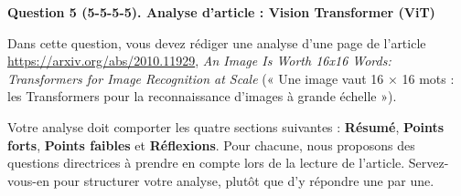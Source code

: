 \documentclass[12pt]{article}
\newif\ifsolution
\theoremstyle{definition}
\newcommand{\Answer}[1]{%
  \ifsolution
    {\color{answer}#1}%
  \fi
}
\newcommand{\question}[2]{\par\medskip\noindent\textbf{Question #1. #2}\par\medskip}
\begin{document}
\Answer{

}

\question{5 (5-5-5-5)}{Analyse d'article : Vision Transformer (ViT)}
Dans cette question, vous devez rédiger une analyse d'une page de l'article \url{https://arxiv.org/abs/2010.11929}, \textit{An Image Is Worth 16x16 Words: Transformers for Image Recognition at Scale} (« Une image vaut 16 × 16 mots : les Transformers pour la reconnaissance d'images à grande échelle »).

Votre analyse doit comporter les quatre sections suivantes : \textbf{Résumé}, \textbf{Points forts}, \textbf{Points faibles} et \textbf{Réflexions}. Pour chacune, nous proposons des questions directrices à prendre en compte lors de la lecture de l'article. Servez-vous-en pour structurer votre analyse, plutôt que d'y répondre une par une.
\end{document}
